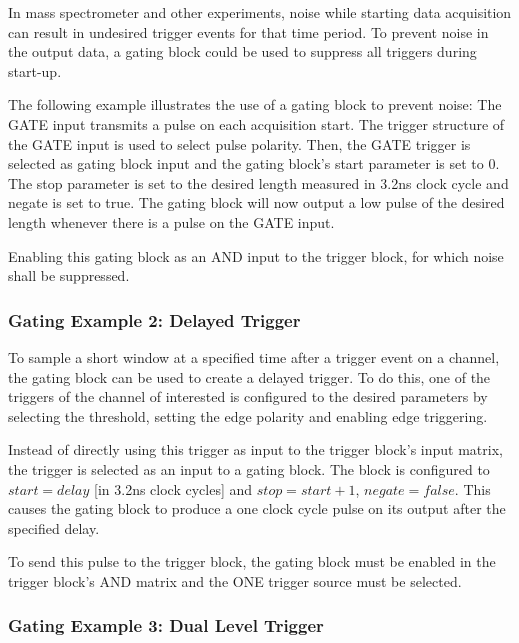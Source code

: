             In mass spectrometer and other experiments, noise while starting data acquisition can result in undesired trigger events for that time period. To prevent noise in the output data, a gating block could be used to suppress all triggers during start-up.\par
            
            The following example illustrates the use of a gating block to prevent noise: The GATE input transmits a pulse on each acquisition start. The trigger structure of the GATE input is used to select pulse polarity. Then, the GATE trigger is selected as gating block input and the gating block's start parameter is set to 0. The stop parameter is set to the desired length measured in 3.2ns clock cycle and negate is set to true. The gating block will now output a low pulse of the desired length whenever there is a pulse on the GATE input.\par
            
        Enabling this gating block as an AND input to the trigger block, for which noise shall be suppressed.
            
        \subsubsection{Gating Example 2: Delayed Trigger}
        
            To sample a short window at a specified time after a trigger event on a channel, the gating block can be used to create a delayed trigger. To do this, one of the triggers of the channel of interested is configured to the desired parameters by selecting the threshold, setting the edge polarity and enabling edge triggering.\par

            Instead of directly using this trigger as input to the trigger block's input matrix, the trigger is selected as an input to a gating block. The block is configured to $start = delay$ [in 3.2ns clock cycles] and $stop = start+1$, $negate = false$. This causes the gating block to produce a one clock cycle pulse on its output after the specified delay.\par

            To send this pulse to the trigger block, the gating block must be enabled in the trigger block's AND matrix and the ONE trigger source must be selected. 
            
        \subsubsection{Gating Example 3: Dual Level Trigger}
        
